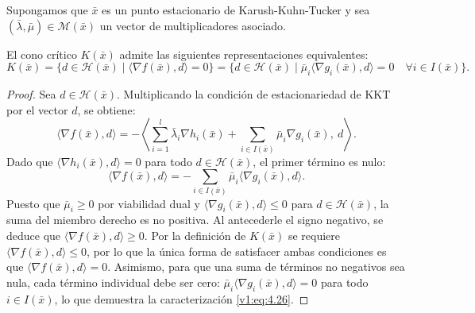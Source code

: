 \begin{lemma}\label{v1:lem:caracterizacion_cono_critico}
 Supongamos que $\bar{x}$ es un punto estacionario de Karush-Kuhn-Tucker y sea $(\bar{\lambda}, \bar{\mu}) \in \mathcal{M}(\bar{x})$ un vector de multiplicadores asociado.
 
 El cono crítico $K(\bar{x})$ admite las siguientes representaciones equivalentes:
 \begin{equation}
 K(\bar{x}) = \{ d \in \mathcal{H}(\bar{x}) \mid \langle \nabla f(\bar{x}), d \rangle = 0 \} = \{ d \in \mathcal{H}(\bar{x}) \mid \bar{\mu}_i \langle \nabla g_i(\bar{x}), d \rangle = 0 \quad \forall i \in I(\bar{x}) \}.
 \label{v1:eq:4.26}
 \end{equation}
\end{lemma}

\begin{proof}
 Sea $d \in \mathcal{H}(\bar{x})$. Multiplicando la condición de estacionariedad de KKT por el vector $d$, se obtiene:
 \[
 \langle \nabla f(\bar{x}), d \rangle = - \left\langle \sum_{i=1}^l \bar{\lambda}_i \nabla h_i(\bar{x}) + \sum_{i \in I(\bar{x})} \bar{\mu}_i \nabla g_i(\bar{x}), \: d \right\rangle.
 \]
 Dado que $\langle \nabla h_i(\bar{x}), d \rangle = 0$ para todo $d \in \mathcal{H}(\bar{x})$, el primer término es nulo:
 \[
 \langle \nabla f(\bar{x}), d \rangle = - \sum_{i \in I(\bar{x})} \bar{\mu}_i \langle \nabla g_i(\bar{x}), d \rangle.
 \]
 Puesto que $\bar{\mu}_i \ge 0$ por viabilidad dual y $\langle \nabla g_i(\bar{x}), d \rangle \le 0$ para $d \in \mathcal{H}(\bar{x})$, la suma del miembro derecho es no positiva. Al antecederle el signo negativo, se deduce que $\langle \nabla f(\bar{x}), d \rangle \ge 0$. Por la definición de $K(\bar{x})$ se requiere $\langle \nabla f(\bar{x}), d \rangle \le 0$, por lo que la única forma de satisfacer ambas condiciones es que $\langle \nabla f(\bar{x}), d \rangle = 0$. Asimismo, para que una suma de términos no negativos sea nula, cada término individual debe ser cero: $\bar{\mu}_i \langle \nabla g_i(\bar{x}), d \rangle = 0$ para todo $i \in I(\bar{x})$, lo que demuestra la caracterización \eqref{v1:eq:4.26}.
\end{proof}


